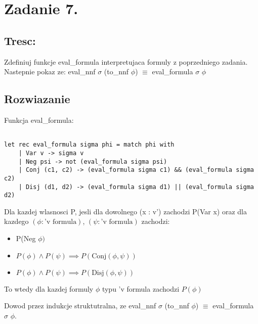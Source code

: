 \documentclass{article}
\begin{document}
\section{Zadanie 7.}

\subsection{Tresc:}

Zdefiniuj funkcje eval\_formula interpretujaca formuly z poprzedniego zadania. Nastepnie pokaz ze: eval\_nnf $\sigma$ (to\_nnf $\phi$) $\equiv$ eval\_formula $\sigma$ $\phi$ 

\subsection{Rozwiazanie}

Funkcja eval\_formula:

\begin{lstlisting}

let rec eval_formula sigma phi = match phi with
    | Var v -> sigma v
    | Neg psi -> not (eval_formula sigma psi)
    | Conj (c1, c2) -> (eval_formula sigma c1) && (eval_formula sigma c2)
    | Disj (d1, d2) -> (eval_formula sigma d1) || (eval_formula sigma d2)

\end{lstlisting}

\begin{tcolorbox}[colback=white!90!blue,colframe=black!35!blue,title=Zasada indukcji dla typu 'v formula]

    Dla kazdej wlasnosci P, jesli dla dowolnego (x : v') zachodzi P(Var x) oraz dla kazdego $(\phi : \text{'v formula})$, $(\psi : \text{'v formula})$ zachodzi:
    \begin{itemize}
        \item P(Neg $\phi)$
        \item $P(\phi) \land P(\psi) \implies P(\text{Conj}(\phi, \psi))$
        \item $P(\phi) \land P(\psi) \implies P(\text{Disj}(\phi, \psi))$
        
    \end{itemize}
 To wtedy dla kazdej formuly $\phi$ typu 'v formula zachodzi $P(\phi)$

\end{tcolorbox}


Dowod przez indukcje struktutralna, ze eval\_nnf $\sigma$ (to\_nnf $\phi$) $\equiv$ eval\_formula $\sigma$ $\phi$.
\end{document}
